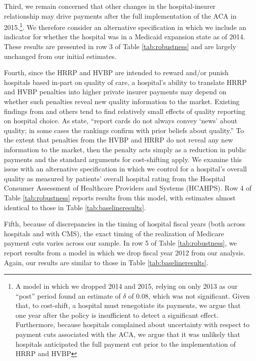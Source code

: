 \documentclass[12pt]{article}
\begin{document}
Third, we remain concerned that other changes in the hospital-insurer relationship may drive payments after the full implementation of the ACA in 2015.\footnote{A model in which we dropped 2014 and 2015, relying on only 2013 as our ``post'' period found an estimate of $\delta$ of 0.08, which was not significant.  Given that, to cost-shift, a hospital must renegotiate its payments, we argue that one year after the policy is insufficient to detect a significant effect.  Furthermore, because hospitals complained about uncertainty with respect to payment cuts associated with the ACA, we argue that it was unlikely that hospitals anticipated the full payment cut prior to the implementation of HRRP and HVBP}. We therefore consider an alternative specification in which we include an indicator for whether the hospital was in a Medicaid expansion state as of 2014. These results are presented in row 3 of Table \ref{tab:robustness} and are largely unchanged from our initial estimates.

Fourth, since the HRRP and HVBP are intended to reward and/or punish hospitals based in-part on quality of care, a hospital's ability to translate HRRP and HVBP penalties into higher private insurer payments may depend on whether such penalties reveal new quality information to the market. Existing findings from \cite{dranove2008} and others tend to find relatively small effects of quality reporting on hospital choice. As \cite{dranove2008} state, ``report cards do not always convey `news' about quality; in some cases the rankings confirm with prior beliefs about quality.'' To the extent that penalties from the HVBP and HRRP do not reveal any new information to the market, then the penalty acts simply as a reduction in public payments and the standard arguments for cost-shifting apply. We examine this issue with an alternative specification in which we control for a hospital's overall quality as measured by patients' overall hospital rating from the Hospital Consumer Assessment of Healthcare Providers and Systems (HCAHPS).  Row 4 of Table \ref{tab:robustness} reports results from this model, with estimates almost identical to those in Table \ref{tab:baselineresults}.

Fifth, because of discrepancies in the timing of hospital fiscal years (both across hospitals and with CMS), the exact timing of the realization of Medicare payment cuts varies across our sample. In row 5 of Table \ref{tab:robustness}, we report results from a model in which we drop fiscal year 2012 from our analysis. Again, our results are similar to those in Table \ref{tab:baselineresults}.
\end{document}
